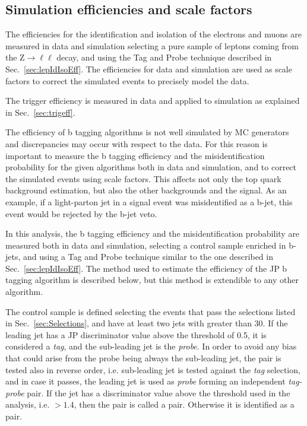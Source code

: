 \subsection{Simulation efficiencies and scale factors}\label{sec:ScaleFactors}
The efficiencies for the identification and isolation of the electrons and muons are measured in data and simulation selecting a pure sample of leptons coming from the Z$\to\ell\ell$ decay, and using the Tag and Probe technique described in Sec.~\ref{sec:lepIdIsoEff}. The efficiencies for data and simulation are used as scale factors to correct the simulated events to precisely model the data.

The trigger efficiency is measured in data and applied to simulation as explained in Sec.~\ref{sec:trigeff}.

The efficiency of b tagging algorithms is not well simulated by MC generators and discrepancies may occur with respect to the data. For this reason is important to measure the b tagging efficiency and the misidentification probability for the given algorithms both in data and simulation, and to correct the simulated events using scale factors. This affects not only the top quark background estimation, but also the other backgrounds and the signal. As an example, if a light-parton jet in a signal event was misidentified as a b-jet, this event would be rejected by the b-jet veto.

In this analysis, the b tagging efficiency and the misidentification probability are measured both in data and simulation, selecting a control sample enriched in b-jets, and using a Tag and Probe technique similar to the one described in Sec.~\ref{sec:lepIdIsoEff}. The method used to estimate the efficiency of the JP b tagging algorithm is described below, but this method is extendible to any other algorithm.

The control sample is defined selecting the events that pass the selections listed in Sec.~\ref{sec:Selections}, and have at least two jets with \pt greater than 30\GeV. If the leading jet has a JP discriminator value above the threshold of 0.5, it is considered a \emph{tag}, and the sub-leading jet is the \emph{probe}. In order to avoid any bias that could arise from the probe being always the sub-leading jet, the pair is tested also in reverse order, i.e. sub-leading jet is tested against the \emph{tag} selection, and in case it passes, the leading jet is used as \emph{probe} forming an independent \emph{tag-probe} pair. If the \probe jet has a discriminator value above the threshold used in the analysis, i.e. $>1.4$, then the \tp pair is called a \tpp pair. Otherwise it is identified as a \tfp pair.

